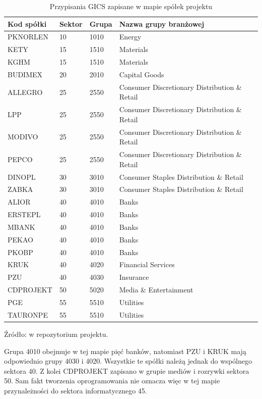 \documentclass[12pt,a4paper,twoside]{report}
\begin{document}
\begin{table}[p]
\centering
\caption{Przypisania GICS zapisane w mapie spółek projektu}
\label{tab:gics-companies}
\small
\begin{tabularx}{\textwidth}{p{2.7cm}p{1.2cm}p{1.2cm}X}
\toprule
Kod spółki & Sektor & Grupa & Nazwa grupy branżowej \\
\midrule
PKNORLEN & 10 & 1010 & Energy \\
KETY & 15 & 1510 & Materials \\
KGHM & 15 & 1510 & Materials \\
BUDIMEX & 20 & 2010 & Capital Goods \\
ALLEGRO & 25 & 2550 & Consumer Discretionary Distribution \& Retail \\
LPP & 25 & 2550 & Consumer Discretionary Distribution \& Retail \\
MODIVO & 25 & 2550 & Consumer Discretionary Distribution \& Retail \\
PEPCO & 25 & 2550 & Consumer Discretionary Distribution \& Retail \\
DINOPL & 30 & 3010 & Consumer Staples Distribution \& Retail \\
ZABKA & 30 & 3010 & Consumer Staples Distribution \& Retail \\
ALIOR & 40 & 4010 & Banks \\
ERSTEPL & 40 & 4010 & Banks \\
MBANK & 40 & 4010 & Banks \\
PEKAO & 40 & 4010 & Banks \\
PKOBP & 40 & 4010 & Banks \\
KRUK & 40 & 4020 & Financial Services \\
PZU & 40 & 4030 & Insurance \\
CDPROJEKT & 50 & 5020 & Media \& Entertainment \\
PGE & 55 & 5510 & Utilities \\
TAURONPE & 55 & 5510 & Utilities \\
\bottomrule
\end{tabularx}
\par\smallskip
\raggedright\footnotesize Źródło:  w repozytorium projektu.
\end{table}

Grupa 4010 obejmuje w tej mapie pięć banków, natomiast PZU i KRUK mają odpowiednio grupy 4030 i 4020. Wszystkie te spółki należą jednak do wspólnego sektora 40. Z kolei CDPROJEKT zapisano w grupie mediów i rozrywki sektora 50. Sam fakt tworzenia oprogramowania nie oznacza więc w tej mapie przynależności do sektora informatycznego 45.
\end{document}
